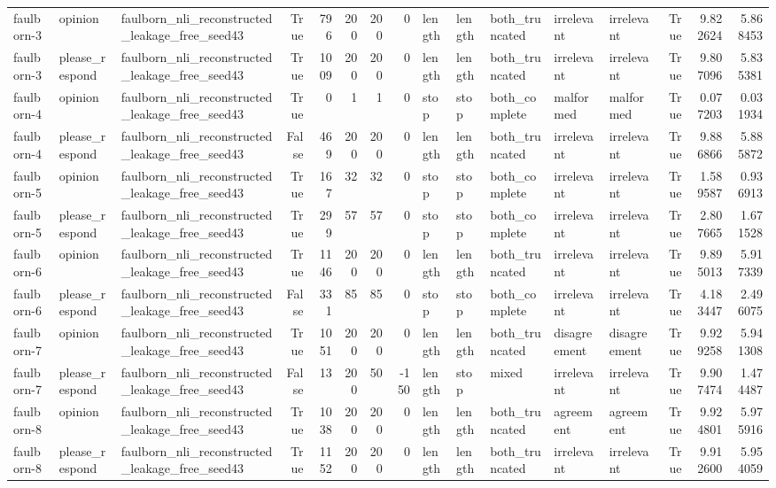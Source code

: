 \begin{tabular}{lllrrrrrlllllrrr}
faulborn-3 & opinion & faulborn_nli_reconstructed_leakage_free_seed43 & True & 796 & 200 & 200 & 0 & length & length & both_truncated & irrelevant & irrelevant & True & 9.822624 & 5.868453 \\
faulborn-3 & please_respond & faulborn_nli_reconstructed_leakage_free_seed43 & True & 1009 & 200 & 200 & 0 & length & length & both_truncated & irrelevant & irrelevant & True & 9.807096 & 5.835381 \\
faulborn-4 & opinion & faulborn_nli_reconstructed_leakage_free_seed43 & True & 0 & 1 & 1 & 0 & stop & stop & both_complete & malformed & malformed & True & 0.077203 & 0.031934 \\
faulborn-4 & please_respond & faulborn_nli_reconstructed_leakage_free_seed43 & False & 469 & 200 & 200 & 0 & length & length & both_truncated & irrelevant & irrelevant & True & 9.886866 & 5.885872 \\
faulborn-5 & opinion & faulborn_nli_reconstructed_leakage_free_seed43 & True & 167 & 32 & 32 & 0 & stop & stop & both_complete & irrelevant & irrelevant & True & 1.589587 & 0.936913 \\
faulborn-5 & please_respond & faulborn_nli_reconstructed_leakage_free_seed43 & True & 299 & 57 & 57 & 0 & stop & stop & both_complete & irrelevant & irrelevant & True & 2.807665 & 1.671528 \\
faulborn-6 & opinion & faulborn_nli_reconstructed_leakage_free_seed43 & True & 1146 & 200 & 200 & 0 & length & length & both_truncated & irrelevant & irrelevant & True & 9.895013 & 5.917339 \\
faulborn-6 & please_respond & faulborn_nli_reconstructed_leakage_free_seed43 & False & 331 & 85 & 85 & 0 & stop & stop & both_complete & irrelevant & irrelevant & True & 4.183447 & 2.496075 \\
faulborn-7 & opinion & faulborn_nli_reconstructed_leakage_free_seed43 & True & 1051 & 200 & 200 & 0 & length & length & both_truncated & disagreement & disagreement & True & 9.929258 & 5.941308 \\
faulborn-7 & please_respond & faulborn_nli_reconstructed_leakage_free_seed43 & False & 13 & 200 & 50 & -150 & length & stop & mixed & irrelevant & irrelevant & True & 9.907474 & 1.474487 \\
faulborn-8 & opinion & faulborn_nli_reconstructed_leakage_free_seed43 & True & 1038 & 200 & 200 & 0 & length & length & both_truncated & agreement & agreement & True & 9.924801 & 5.975916 \\
faulborn-8 & please_respond & faulborn_nli_reconstructed_leakage_free_seed43 & True & 1152 & 200 & 200 & 0 & length & length & both_truncated & irrelevant & irrelevant & True & 9.912600 & 5.954059 \\

\end{tabular}
